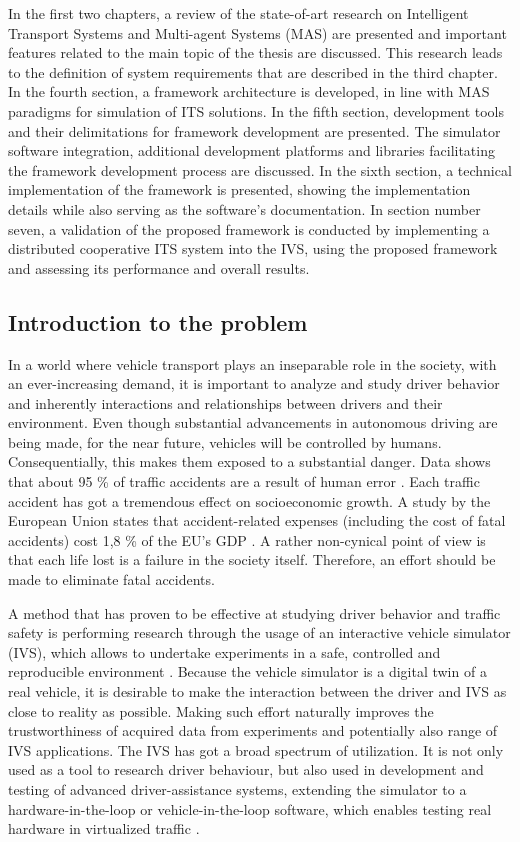 \documentclass[titlepage, 12pt]{article}
\begin{document}
In the first two chapters, a review of the state-of-art research on Intelligent Transport
Systems and Multi-agent Systems (MAS) are presented and important features related
to the main topic of the thesis are discussed. This research leads to the definition of system requirements
that are described in the third chapter. In the fourth section, a framework architecture 
is developed, in line with MAS paradigms for simulation of ITS solutions. In the fifth
section, development tools and their delimitations for framework development are presented.
The simulator software integration, additional development platforms and
libraries facilitating the framework development process are discussed. In the sixth section,
a technical implementation of the framework is presented, showing the implementation details
while also serving as the software's documentation. In section number seven, a validation of
the proposed framework is conducted by implementing a distributed cooperative ITS system into the
IVS, using the proposed framework and assessing its performance and overall results.

\subsection{Introduction to the problem}

In a world where vehicle transport plays an inseparable role in the society, with an ever-increasing
demand, it is important to analyze and study driver behavior and inherently interactions and
relationships between drivers and their environment. Even though
substantial advancements in autonomous driving are being made, for the near future, vehicles 
will be controlled by humans. Consequentially, this makes them exposed to a substantial danger. 
Data shows that about 95 \% of traffic accidents are a result of human error \cite{Parliament2021}. 
Each traffic accident has got a tremendous effect on socioeconomic growth. A study by the European
Union states that accident-related expenses (including the cost of fatal accidents) cost 1,8 \% of the EU's GDP \cite{Wijnen2017}.  
A rather non-cynical point of view is that each life lost is a failure in the society itself.
Therefore, an effort should be made to eliminate fatal accidents.

A method that has proven to be effective at studying driver behavior and traffic safety is 
performing research through the usage of an interactive vehicle simulator (IVS), which allows to undertake experiments in a safe,
controlled and reproducible environment \cite{Winter2012}. Because the vehicle simulator is a digital
twin of a real vehicle, it is desirable to make the interaction between the driver
and IVS as close to reality as possible. Making such effort naturally improves the trustworthiness of
acquired data from experiments and potentially also range of IVS applications. The IVS has
got a broad spectrum of utilization. It is not only used as a tool to research driver
behaviour, but also used in development and testing of advanced driver-assistance systems,
extending the simulator to a hardware-in-the-loop or vehicle-in-the-loop software, which
enables testing real hardware in virtualized traffic \cite{Horvath2019}.
\end{document}
